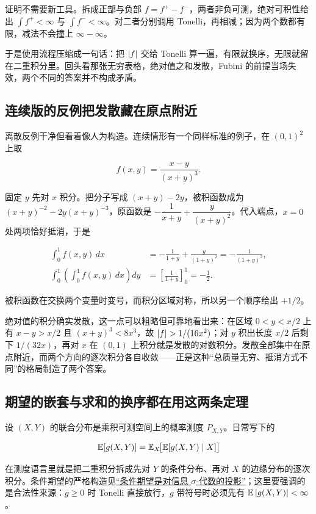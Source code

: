 证明不需要新工具。拆成正部与负部 \(f=f^+-f^-\)，两者非负可测，绝对可积性给出 \(\int f^+<\infty\) 与 \(\int f^-<\infty\)。对二者分别调用 Tonelli，再相减；因为两个数都有限，减法不会撞上 \(\infty-\infty\)。

于是使用流程压缩成一句话：把 \(\left|f\right|\) 交给 Tonelli 算一遍，有限就换序，无限就留在二重积分里。回头看那张无穷表格，绝对值之和发散，Fubini 的前提当场失效，两个不同的答案并不构成矛盾。

\subsection{连续版的反例把发散藏在原点附近}

离散反例干净但看着像人为构造。连续情形有一个同样标准的例子，在 \((0,1)^2\) 上取

\[
f(x,y)=\frac{x-y}{(x+y)^3}.
\]

固定 \(y\) 先对 \(x\) 积分。把分子写成 \((x+y)-2y\)，被积函数成为 \((x+y)^{-2}-2y(x+y)^{-3}\)，原函数是 \(-\dfrac{1}{x+y}+\dfrac{y}{(x+y)^2}\)。代入端点，\(x=0\) 处两项恰好抵消，于是

\[
\begin{aligned}
\int_0^1 f(x,y)\,dx
&=-\frac{1}{1+y}+\frac{y}{(1+y)^2}
=-\frac{1}{(1+y)^2},\\[2pt]
\int_0^1\!\left(\int_0^1 f(x,y)\,dx\right)dy
&=\left[\frac{1}{1+y}\right]_0^1=-\frac12 .
\end{aligned}
\]

被积函数在交换两个变量时变号，而积分区域对称，所以另一个顺序给出 \(+1/2\)。

绝对值的积分确实发散，这一点可以粗略但可靠地看出来：在区域 \(0<y<x/2\) 上有 \(x-y>x/2\) 且 \((x+y)^3<8x^3\)，故 \(\abs{f}>1/(16x^2)\)；对 \(y\) 积出长度 \(x/2\) 后剩下 \(1/(32x)\)，再对 \(x\) 在 \((0,1)\) 上积分就是发散的对数积分。发散全部集中在原点附近，而两个方向的逐次积分各自收敛——正是这种``总质量无穷、抵消方式不同''的格局制造了两个答案。

\subsection{期望的嵌套与求和的换序都在用这两条定理}

设 \((X,Y)\) 的联合分布是乘积可测空间上的概率测度 \(P_{X,Y}\)。日常写下的

\[
\mathbb{E}[g(X,Y)]=\mathbb{E}_X\!\bigl[\mathbb{E}[g(X,Y)\mid X]\bigr]
\]

在测度语言里就是把二重积分拆成先对 \(Y\) 的条件分布、再对 \(X\) 的边缘分布的逐次积分。条件期望的严格构造见\hyperref[sec:12-Real-Analysis-Support/05-Measure-Integration-and-Conditional-Expectation/05]{``条件期望是对信息 \(\sigma\)-代数的投影''}；这里要强调的是合法性来源：\(g\ge0\) 时 Tonelli 直接放行，\(g\) 带符号时必须先有 \(\mathbb{E}\left|g(X,Y)\right|<\infty\)。

